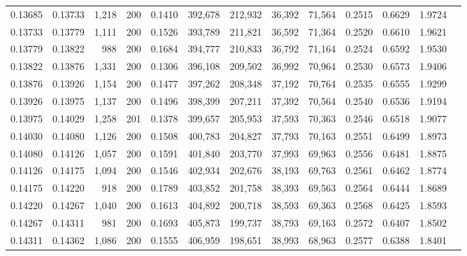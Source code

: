 \begin{tabular}{rrrrrrrrrrrrr}
0.13685 & 0.13733 & 1,218 & 200 &                                     0.1410 & 392,678 & 212,932 &  36,392 &  71,564 & 0.2515 & 0.6629 & 1.9724 \\
0.13733 & 0.13779 & 1,111 & 200 &                                     0.1526 & 393,789 & 211,821 &  36,592 &  71,364 & 0.2520 & 0.6610 & 1.9621 \\
0.13779 & 0.13822 &   988 & 200 &                                     0.1684 & 394,777 & 210,833 &  36,792 &  71,164 & 0.2524 & 0.6592 & 1.9530 \\
0.13822 & 0.13876 & 1,331 & 200 &                                     0.1306 & 396,108 & 209,502 &  36,992 &  70,964 & 0.2530 & 0.6573 & 1.9406 \\
0.13876 & 0.13926 & 1,154 & 200 &                                     0.1477 & 397,262 & 208,348 &  37,192 &  70,764 & 0.2535 & 0.6555 & 1.9299 \\
0.13926 & 0.13975 & 1,137 & 200 &                                     0.1496 & 398,399 & 207,211 &  37,392 &  70,564 & 0.2540 & 0.6536 & 1.9194 \\
0.13975 & 0.14029 & 1,258 & 201 &                                     0.1378 & 399,657 & 205,953 &  37,593 &  70,363 & 0.2546 & 0.6518 & 1.9077 \\
0.14030 & 0.14080 & 1,126 & 200 &                                     0.1508 & 400,783 & 204,827 &  37,793 &  70,163 & 0.2551 & 0.6499 & 1.8973 \\
0.14080 & 0.14126 & 1,057 & 200 &                                     0.1591 & 401,840 & 203,770 &  37,993 &  69,963 & 0.2556 & 0.6481 & 1.8875 \\
0.14126 & 0.14175 & 1,094 & 200 &                                     0.1546 & 402,934 & 202,676 &  38,193 &  69,763 & 0.2561 & 0.6462 & 1.8774 \\
0.14175 & 0.14220 &   918 & 200 &                                     0.1789 & 403,852 & 201,758 &  38,393 &  69,563 & 0.2564 & 0.6444 & 1.8689 \\
0.14220 & 0.14267 & 1,040 & 200 &                                     0.1613 & 404,892 & 200,718 &  38,593 &  69,363 & 0.2568 & 0.6425 & 1.8593 \\
0.14267 & 0.14311 &   981 & 200 &                                     0.1693 & 405,873 & 199,737 &  38,793 &  69,163 & 0.2572 & 0.6407 & 1.8502 \\
0.14311 & 0.14362 & 1,086 & 200 &                                     0.1555 & 406,959 & 198,651 &  38,993 &  68,963 & 0.2577 & 0.6388 & 1.8401 \\

\end{tabular}

